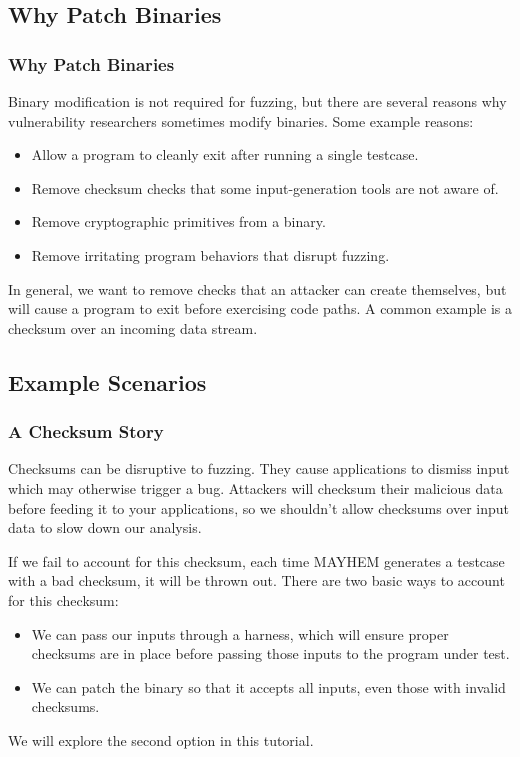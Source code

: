 \documentclass{beamer}
\begin{document}
\subsection{Why Patch Binaries}
\begin{frame}
\frametitle{Why Patch Binaries}
Binary modification is not required for fuzzing, but there are several reasons
why vulnerability researchers sometimes modify binaries. Some example reasons:

\begin{itemize}
  \item Allow a program to cleanly exit after running a single testcase.
  \item Remove checksum checks that some input-generation tools are not aware
    of.
  \item Remove cryptographic primitives from a binary.
  \item Remove irritating program behaviors that disrupt fuzzing.
\end{itemize}

In general, we want to remove checks that an attacker can create themselves, but will cause a program to exit before exercising code paths. A common example is a checksum over an incoming data stream.
\end{frame}

\subsection{Example Scenarios}

\begin{frame}
\frametitle{A Checksum Story}
Checksums can be disruptive to fuzzing. They cause applications to dismiss input
which may otherwise trigger a bug. Attackers will checksum their malicious data
before feeding it to your applications, so we shouldn't allow checksums over
input data to slow down our analysis.
\par
If we fail to account for this checksum, each time MAYHEM generates a testcase
with a bad checksum, it will be thrown out. There are two basic ways to
account for this checksum:

\begin{itemize}
  \item We can pass our inputs through a harness, which will ensure proper
    checksums are in place before passing those inputs to the program under
    test.
  \item We can patch the binary so that it accepts all inputs, even those with
    invalid checksums.
\end{itemize}

We will explore the second option in this tutorial.
\end{frame}
\end{document}
